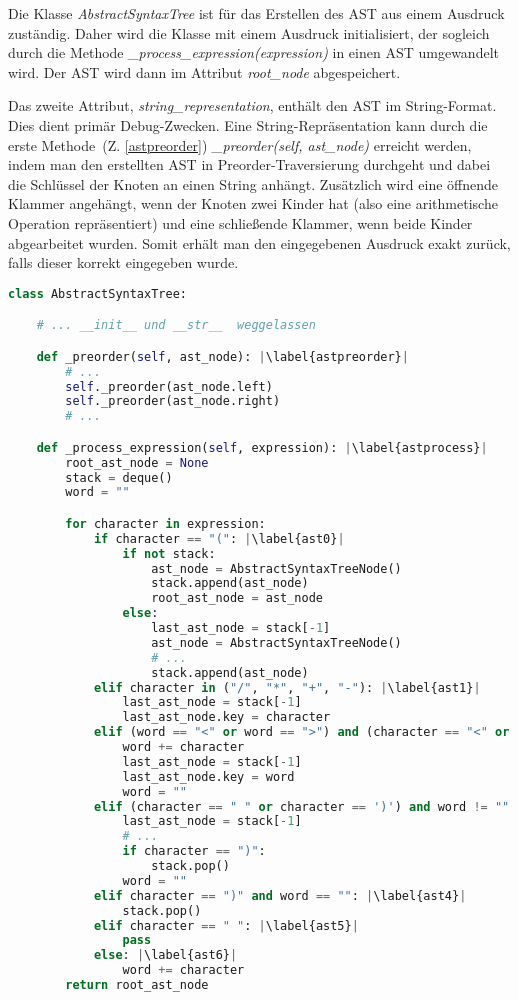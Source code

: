 Die Klasse \textit{AbstractSyntaxTree} ist für das Erstellen des AST aus einem Ausdruck zuständig. 
Daher wird die Klasse mit einem Ausdruck initialisiert, der sogleich durch die 
Methode \textit{\_process\_expression(expression)} in einen AST umgewandelt wird. Der AST wird dann im Attribut \textit{root\_node} abgespeichert.

Das zweite Attribut, \textit{string\_representation}, enthält den AST im String-Format. Dies dient primär Debug-Zwecken.
Eine String-Repräsentation kann durch die erste Methode~(Z. \ref{astpreorder}) \textit{\_preorder(self, ast\_node)} erreicht werden,
indem man den erstellten AST in Preorder-Traversierung durchgeht und dabei die Schlüssel der Knoten an einen String anhängt.
Zusätzlich wird eine öffnende Klammer angehängt, wenn der Knoten zwei Kinder hat (also eine arithmetische Operation repräsentiert) und eine schließende Klammer,
wenn beide Kinder abgearbeitet wurden. Somit erhält man den eingegebenen Ausdruck exakt zurück, falls dieser korrekt eingegeben wurde.

\begin{lstlisting}[language=Python, escapechar=|, caption=Klasse \textit{AbstractSyntaxTree}, label={lst:ast}]
class AbstractSyntaxTree:

    # ... __init__ und __str__  weggelassen 

    def _preorder(self, ast_node): |\label{astpreorder}|
        # ...
        self._preorder(ast_node.left)
        self._preorder(ast_node.right)
        # ...

    def _process_expression(self, expression): |\label{astprocess}|
        root_ast_node = None
        stack = deque()
        word = ""

        for character in expression:
            if character == "(": |\label{ast0}|
                if not stack:
                    ast_node = AbstractSyntaxTreeNode()
                    stack.append(ast_node)
                    root_ast_node = ast_node
                else:
                    last_ast_node = stack[-1]
                    ast_node = AbstractSyntaxTreeNode()
                    # ...
                    stack.append(ast_node)
            elif character in ("/", "*", "+", "-"): |\label{ast1}|
                last_ast_node = stack[-1]
                last_ast_node.key = character
            elif (word == "<" or word == ">") and (character == "<" or character == ">"): |\label{ast2}|
                word += character
                last_ast_node = stack[-1]
                last_ast_node.key = word
                word = ""
            elif (character == " " or character == ')') and word != "": |\label{ast3}|
                last_ast_node = stack[-1]
                # ...
                if character == ")":
                    stack.pop()
                word = ""
            elif character == ")" and word == "": |\label{ast4}|
                stack.pop()
            elif character == " ": |\label{ast5}|
                pass
            else: |\label{ast6}|
                word += character
        return root_ast_node
\end{lstlisting}

